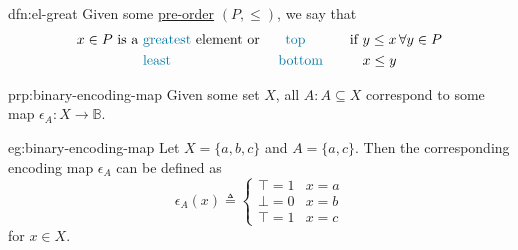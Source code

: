 \begin{dfn}{dfn:el-great}
    Given some \hyperref[dfn:pre-order]{pre-order} \( (P, \leq) \), we say that
    \begin{alignat*}{3}
        x \in P \text{ is a }
        &\text{\textcolor{dfn-color}{greatest}} \text{ element or }
        &\text{\textcolor{dfn-color}{top}} \hspace{1cm} \text{ if }
        &y \leq x \, \forall y \in P \\
        &\text{\textcolor{dfn-color}{least}} &\text{\textcolor{dfn-color}{bottom}} \hspace{1cm}
        &x \leq y
    \end{alignat*}
\end{dfn}

\begin{prp}{prp:binary-encoding-map}
    Given some set \( X \), all \( A : A \subseteq X \) correspond to some map \( \epsilon_{A} : X \to \mathbb{B} \).
\end{prp}

\begin{eg}{eg:binary-encoding-map}
    Let \( X = \{ a, b, c \} \) and \( A = \{ a, c \} \).
    Then the corresponding encoding map \( \epsilon_{A} \) can be defined as
    \[
        \epsilon_{A}(x) \triangleq
        \begin{cases}
            \top = 1 & x = a \\
            \bot = 0 & x = b \\
            \top = 1 & x = c
        \end{cases}
    \]
    for \( x \in X \).
\end{eg}


